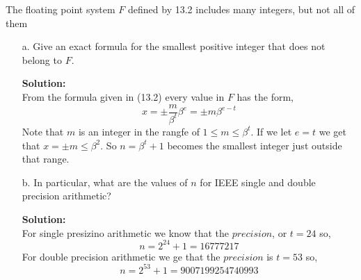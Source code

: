 \documentclass[12pt]{article}
\makeatletter
\theoremstyle{homework}
\newenvironment{exercise}[1]
{\def\@currentlabel{#1}\exercisecore}
{\endexercisecore}
\newcommand{\localhead}[1]{\par\smallskip\noindent\textbf{#1}\nobreak\\}%
\newcommand\solution{\localhead{Solution:}}
\makeatother
\begin{document}
  \begin{exercise}{13.2} The floating point system $F$ defined by 13.2 includes many integers, but not all of them\\
    \begin{enumerate}
      \item[a.] Give an exact formula for the smallest positive integer that does not belong to $F$. \\
      \solution From the formula given in (13.2) every value in $F$ has the form, 
      \begin{equation*}
        x = \pm \frac{m}{\beta^t}\beta^e = \pm m\beta^{e-t}
      \end{equation*}
      Note that $m$ is an integer in the rangfe of $1 \leq m \leq \beta^t$. If we let $e = t$ we get that $x = \pm m \leq \beta^2 $. So 
      $n = \beta^t + 1$ becomes the smallest integer just outside that range. 

      \item[b.] In particular, what are the values of $n$ for IEEE single  and double precision arithmetic?\\
      \solution For single presizino arithmetic we know that the $precision$, or $t = 24$ so, 
      \begin{equation*}
        n = 2^{24} + 1 = 16777217
      \end{equation*}
      For double precision arithmetic we ge that the $precision$ is $t = 53$ so, 
      \begin{equation*}
        n = 2^{53} + 1 = 9007199254740993
      \end{equation*}
    \end{enumerate}  
  \end{exercise}
  \vspace{1in}
\end{document}
